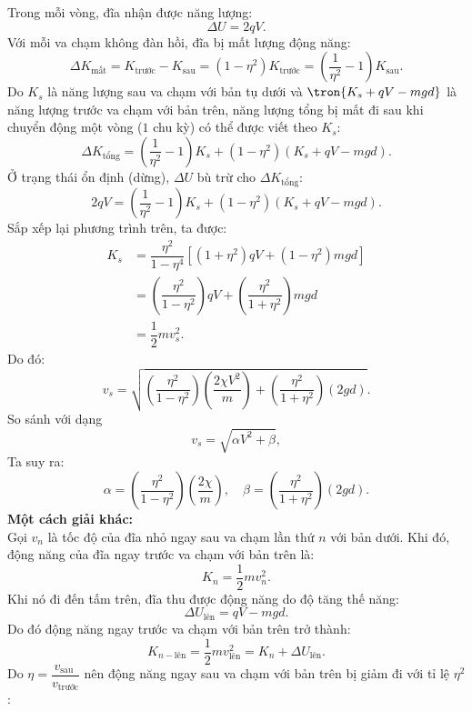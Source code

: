 \begin{loigiai}
\begin{enumerate}[1)]
    Trong mỗi vòng, đĩa nhận được năng lượng: 
    \[\Delta U = 2qV. \tag{d2}\label{q.8.d2}\]
    Với mỗi va chạm không đàn hồi, đĩa bị mất lượng động năng:
    \[\Delta K_{\text{mất}} = K_{\text {trước}} - K_{\text {sau}}=\left(1-\eta^{2}\right) K_{\text {trước}}=\left(\frac{1}{\eta^{2}}-1\right) K_{\text {sau}}. \tag{d3}\label{q.8.d3}\]
    Do $K_s$ là năng lượng sau va chạm với bản tụ dưới và $\tron{K_s + qV - mgd}$ là năng lượng trước va chạm với bản trên, năng lượng tổng bị mất đi sau khi chuyển động một vòng ($1$ chu kỳ) có thể được viết theo $K_s$:
    \[\Delta K_{\text{tổng}}=\left(\dfrac{1}{\eta^{2}}-1\right) K_{{s}}+\left(1-\eta^{2}\right)\left(K_{{s}}+ qV - m g d\right).\tag{d4}\label{q.8.d4}\]
    Ở trạng thái ổn định (dừng), $\Delta U$ bù trừ cho $\Delta K_{\text{tổng}}$:
    \[2qV = \left(\dfrac{1}{\eta^{2}}-1\right) K_{{s}}+\left(1-\eta^{2}\right)\left(K_{{s}}+ qV - m g d\right).\tag{d5}\label{q.8.d5} \]
    Sắp xếp lại phương trình trên, ta được:
    \[\begin{aligned}
    K_{{s}} &= \dfrac{\eta^{2}}{1-\eta^{4}}\left[\left(1+\eta^{2}\right) q V+\left(1-\eta^{2}\right) m g d\right] \\
    &= \left(\dfrac{\eta^{2}}{1-\eta^{2}}\right) q V + \left(\dfrac{\eta^{2}}{1+\eta^{2}}\right) m g d \\
    &= \dfrac{1}{2} m v_{s}^{2}.
    \end{aligned} \tag{d6}\label{q.8.d6}\]
    Do đó:
    \[{v}_{{s}} = \sqrt{\left(\dfrac{\eta^{2}}{1-\eta^{2}}\right)\left(\dfrac{2 \chi V^{2}}{m}\right)+\left(\dfrac{\eta^{2}}{1+\eta^{2}}\right)(2 g d)}. \tag{d7}\label{q.8.d7}\]
    So sánh với dạng 
    \[{v}_{{s}} = \sqrt{\alpha V^{2}+\beta}, \tag{d8}\label{q.8.d8}\]
    Ta suy ra:
    \[\alpha=\left(\dfrac{\eta^{2}}{1-\eta^{2}}\right)\left(\dfrac{2 \chi}{m}\right), \quad \beta=\left(\dfrac{\eta^{2}}{1+\eta^{2}}\right)(2 g d).\tag{d9}\label{q.8.d9}\]
    \textbf{Một cách giải khác:}\\
    Gọi $v_n$ là tốc độ của đĩa nhỏ ngay sau va chạm lần thứ $n$ với bản dưới. Khi đó, động năng của đĩa ngay trước va chạm với bản trên là:
    \[K_n = \dfrac{1}{2}mv_n^2. \tag{d10}\label{q.8.d10}\]
    Khi nó đi đến tấm trên, đĩa thu được động năng do độ tăng thế năng:
    \[\Delta U_{\text{lên}}=q V-m g d. \tag{d11}\label{q.8.d11}\]
    Do đó động năng ngay trước va chạm với bản trên trở thành:
    \[K_{n-\text{lên}}=\frac{1}{2} m {v}_{\text{lên}}^{2} = K_{n}+\Delta U_{\text {lên}}. \tag{d12}\label{q.8.d12} \]
    Do $\eta = \dfrac{{v}_{\text {sau }}}{{v}_{\text {trước}}}$ nên động năng ngay sau va chạm với bản trên bị giảm đi với tỉ lệ $\eta^2$:

\end{enumerate}
\end{loigiai}
